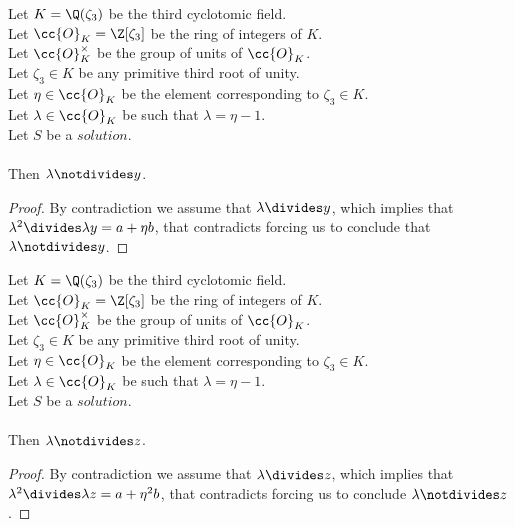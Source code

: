 \begin{lemma}
  \label{lmm:lambda_not_dvd_y}
  \leanok
  Let $K = \Q(\zeta_3)$ be the third cyclotomic field. \\
  Let $\cc{O}_K = \Z[\zeta_3]$ be the ring of integers of $K$. \\
  Let $\cc{O}^\times_K$ be the group of units of $\cc{O}_K$. \\
  Let $\zeta_3 \in K$ be any primitive third root of unity. \\
  Let $\eta \in \cc{O}_K$ be the element corresponding to $\zeta_3 \in K$. \\
  Let $\lambda \in \cc{O}_K$ be such that $\lambda = \eta -1$. \\
  Let $S$ be a $solution$.\\\\
  Then $\lambda \notdivides y$.
\end{lemma}
\begin{proof}
  \leanok
  By contradiction we assume that $\lambda \divides y$, which implies that
  $\lambda^2 \divides \lambda y = a + \eta b$, that contradicts
   forcing us to conclude that
  $\lambda \notdivides y$.
\end{proof}

\begin{lemma}
  \label{lmm:lambda_not_dvd_z}
  \leanok
  Let $K = \Q(\zeta_3)$ be the third cyclotomic field. \\
  Let $\cc{O}_K = \Z[\zeta_3]$ be the ring of integers of $K$. \\
  Let $\cc{O}^\times_K$ be the group of units of $\cc{O}_K$. \\
  Let $\zeta_3 \in K$ be any primitive third root of unity. \\
  Let $\eta \in \cc{O}_K$ be the element corresponding to $\zeta_3 \in K$. \\
  Let $\lambda \in \cc{O}_K$ be such that $\lambda = \eta -1$. \\
  Let $S$ be a $solution$.\\\\
  Then $\lambda \notdivides z$.
\end{lemma}
\begin{proof}
  \leanok
  By contradiction we assume that $\lambda \divides z$, which implies that
  $\lambda^2 \divides \lambda z = a + \eta^2 b$, that contradicts
   forcing us to conclude $\lambda \notdivides z$.
\end{proof}

